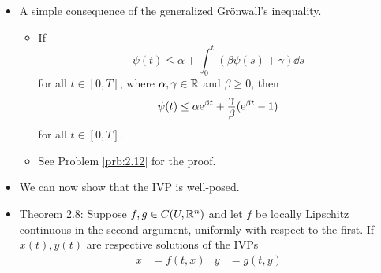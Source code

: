 \documentclass[../notes.tex]{subfiles}
\begin{document}
\begin{itemize}
\begin{proof}
\begin{align*}
        \end{align*}
        where the first equality holds by the product rule and the FTC, and the last inequality above holds by the first assumption in the statement of the lemma. Integrating the above inequality with respect to $t$ and dividing the result by $\phi(t)$ shows that
        \begin{align*}
            \int_0^t\beta(s)\psi(s)\dd{s} &\leq \int_0^t\alpha(s)\beta(s)\frac{\phi(s)}{\phi(t)}\dd{s}
            \alpha(t)+\int_0^t\beta(s)\psi(s)\dd{s} &\leq \alpha(t)+\int_0^t\alpha(s)\beta(s)\exp(\int_s^t\beta(r)\dd{r})\dd{s}
        \end{align*}
        It follows that
        \begin{equation*}
            \psi(t) \leq \alpha(t)+\int_0^t\beta(s)\psi(s)\dd{s}
            \leq \alpha(t)+\int_0^t\alpha(s)\beta(s)\exp(\int_s^t\beta(r)\dd{r})\dd{s}
        \end{equation*}
        as desired.\par
        The proof of the second claim is covered in Problem 2.11 (and is not applicable to course content).
    \end{proof}
    \item A simple consequence of the generalized Gr\"{o}nwall's inequality.
    \begin{itemize}
        \item If
        \begin{equation*}
            \psi(t) \leq \alpha+\int_0^t(\beta\psi(s)+\gamma)\dd{s}
        \end{equation*}
        for all $t\in[0,T]$, where $\alpha,\gamma\in\R$ and $\beta\geq 0$, then
        \begin{equation*}
            \psi(t) \leq \alpha\e[\beta t]+\frac{\gamma}{\beta}(\e[\beta t]-1)
        \end{equation*}
        for all $t\in[0,T]$.
        \item See Problem \ref{prb:2.12} for the proof.
    \end{itemize}
    \item We can now show that the IVP is well-posed.
    \item Theorem 2.8: Suppose $f,g\in C(U,\R^n)$ and let $f$ be locally Lipschitz continuous in the second argument, uniformly with respect to the first. If $x(t),y(t)$ are respective solutions of the IVPs
    \begin{align*}
        \dot{x} &= f(t,x)&
            \dot{y} &= g(t,y)\\

\end{align*}
\end{itemize}
\end{document}
